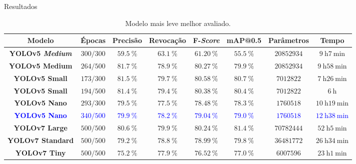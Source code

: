 \begin{frame}[shrink=8]{Resultados}
\begin{table}[h!]
\caption{Modelo mais leve melhor avaliado.} \label{tab:resultadosExperimentais}
\begin{footnotesize}
\begin{tabular}{cccccccc}
\toprule
\textbf{Modelo} & \textbf{Épocas} &\textbf{Precisão} & \textbf{Revocação} & \textbf{F-\emph{Score}} & \textbf{mAP@0.5} & \textbf{Parâmetros} & \textbf{Tempo}\\
\midrule
\textbf{YOLOv5 \emph{Medium}} & $300/300$ & $\SI{59,5}{\percent}$ & $\SI{63,1}{\percent}$ & $\SI{61,20}{\percent}$ & $\SI{55,5}{\percent}$ & $\num{20852934}$ & $\SI{9}{\hour}\SI{7}{\minute}$\\
\textbf{YOLOv5 Medium} & $264/500$ & $\SI{81,7}{\percent}$ & $\SI{78,9}{\percent}$ & $\SI{80,27}{\percent}$ & $\SI{79,9}{\percent}$ & $\num{20852934}$ & $\SI{9}{\hour}\SI{58}{\minute}$\\
\textbf{YOLOv5 Small} & $173/300$ & $\SI{81,5}{\percent}$ & $\SI{79,7}{\percent}$ & $\SI{80,58}{\percent}$ & $\SI{80,7}{\percent}$ & $\num{7012822}$ & $\SI{7}{\hour}\SI{26}{\minute}$\\
\textbf{YOLOv5 Small} & $194/500$ & $\SI{81,4}{\percent}$ & $\SI{79,4}{\percent}$ & $\SI{80,38}{\percent}$ & $\SI{80,4}{\percent}$ & $\num{7012822}$ & $\SI{6}{\hour}$\\
\textbf{YOLOv5 Nano} & $293/300$ & $\SI{79,5}{\percent}$ & $\SI{77,5}{\percent}$ & $\SI{78,48}{\percent}$ & $\SI{78,3}{\percent}$ & $\num{1760518}$ & $\SI{10}{\hour}\SI{19}{\minute}$\\
\textcolor{blue}{\textbf{YOLOv5 Nano}} & \textcolor{blue}{$340/500$} & \textcolor{blue}{$\SI{79,9}{\percent}$} & \textcolor{blue}{$\SI{78,2}{\percent}$} & \textcolor{blue}{$\SI{79,04}{\percent}$} & \textcolor{blue}{$\SI{79,0}{\percent}$} & \textcolor{blue}{$\num{1760518}$} & \textcolor{blue}{$\SI{12}{\hour}\SI{38}{\minute}$}\\
\midrule
\textbf{YOLOv7 Large} & $500/500$ & $\SI{80,6}{\percent}$ & $\SI{79,9}{\percent}$ & $\SI{80,24}{\percent}$ & $\SI{81,4}{\percent}$ & $\num{70782444}$ & $\SI{52}{\hour}\SI{5}{\minute}$\\
\textbf{YOLOv7 Standard} & $500/500$ & $\SI{79,2}{\percent}$ & $\SI{78,8}{\percent}$ & $\SI{78,99}{\percent}$ & $\SI{79,8}{\percent}$ & $\num{36481772}$ & $\SI{26}{\hour}\SI{34}{\minute}$\\
\textbf{YOLOv7 Tiny} & $500/500$ & $\SI{75,2}{\percent}$ & $\SI{77,9}{\percent}$ & $\SI{76,52}{\percent}$ & $\SI{77,0}{\percent}$ & $\num{6007596}$ & $\SI{23}{\hour}\SI{1}{\minute}$\\
\bottomrule
\end{tabular}
\end{footnotesize}
\end{table}
\end{frame}

